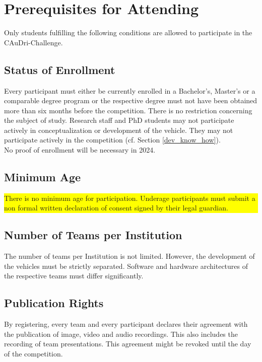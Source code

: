 \chapter{Prerequisites for Attending}

Only students fulfilling the following conditions are allowed to participate in
the CAuDri-Challenge.

\section{Status of Enrollment}

Every participant must either be currently enrolled in a Bachelor’s, Master’s
or a comparable degree program or the respective degree must not have been
obtained more than six months before the competition. There is no restriction
concerning the subject of study. Research staff and PhD students may not
participate actively in conceptualization or development of the vehicle. They
may not participate actively in the competition (cf. Section
\ref{dev_know_how}).\\ No proof of enrollment will be necessary in 2024.

\section{Minimum Age}

\colorbox{yellow}{\parbox{\colorboxwidth}{There is no minimum age for participation. Underage participants must submit a non formal written declaration of consent signed by their legal guardian.}}

\section{Number of Teams per Institution}

The number of teams per Institution is not limited. However, the development of
the vehicles must be strictly separated. Software and hardware architectures of
the respective teams must differ significantly.

\section{Publication Rights}

By registering, every team and every participant declares their agreement with
the publication of image, video and audio recordings. This also includes the
recording of team presentations. This agreement might be revoked until the day
of the competition.